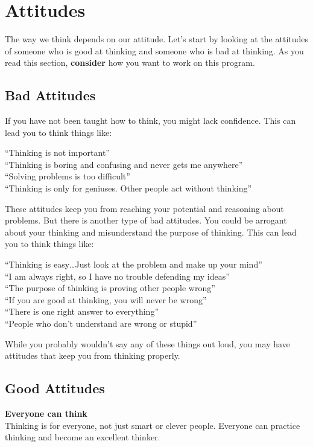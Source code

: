 \chapter{Attitudes}

The way we think depends on our attitude. Let's start by looking at the attitudes of someone who is good at thinking and someone who is bad at thinking. As you read this section, \textbf{consider} how you want to work on this program.

\section*{Bad Attitudes}

If you have not been taught how to think, you might lack confidence. This can lead you to think things like:

``Thinking is not important'' \\
``Thinking is boring and confusing and never gets me anywhere'' \\
``Solving problems is too difficult'' \\
``Thinking is only for geniuses. Other people act without thinking''

These attitudes keep you from reaching your potential and reasoning about problems. But there is another type of bad attitudes. You could be arrogant about your thinking and misunderstand the purpose of thinking. This can lead you to think things like:

``Thinking is easy\ldots Just look at the problem and make up your mind'' \\
``I am always right, so I have no trouble defending my ideas'' \\
``The purpose of thinking is proving other people wrong'' \\
``If you are good at thinking, you will never be wrong'' \\
``There is one right answer to everything'' \\
``People who don't understand are wrong or stupid''

While you probably wouldn't say any of these things out loud, you may have attitudes that keep you from thinking properly.


\section*{Good Attitudes}

\textbf{Everyone can think} \\
Thinking is for everyone, not just smart or clever people. Everyone can practice thinking and become an excellent thinker.

